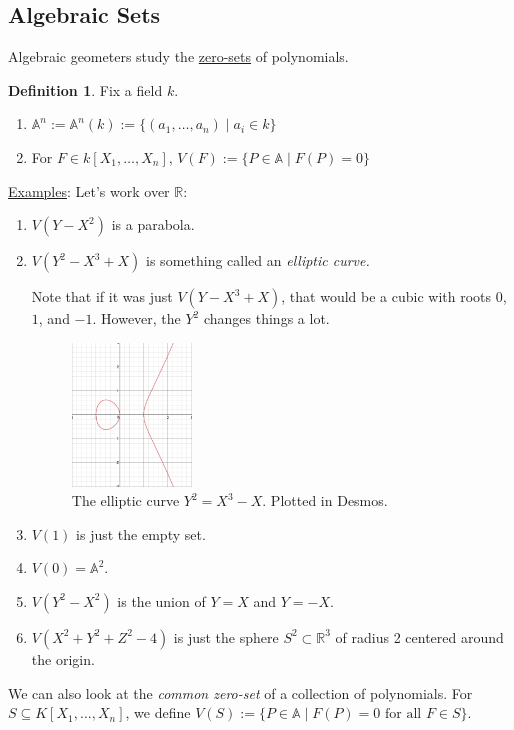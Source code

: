 \documentclass[12pt]{article}
\newcommand{\real}{\mathbb{R}}
\newcommand{\ita}[1]{\textit{#1}}
\theoremstyle{definition}
\newtheorem{definition}[theorem]{Definition}
\begin{document}
\subsection{Algebraic Sets}
Algebraic geometers study the \underline{zero-sets} of polynomials.
\begin{definition}
    Fix a field $k$. 
    \begin{enumerate}
        \item $\mathbb{A}^n:=\mathbb{A}^n(k):=\{(a_1,\dotsc,a_n)\mid a_i\in k\}$
        \item For $F\in k[X_1,\dotsc,X_n]$, $V(F):=\{P\in\mathbb{A}\mid F(P)=0\}$
    \end{enumerate}
\end{definition}
\underline{Examples}: Let's work over $\real$:
\begin{enumerate}
    \item $V(Y-X^2)$ is a parabola.
    \item $V(Y^2-X^3+X)$ is something called an \ita{elliptic curve.}
    
    Note that if it was just $V(Y-X^3+X)$, that would be a cubic with roots $0$, $1$, and $-1$. However, the $Y^2$ changes things a lot. 
    \begin{figure}[H]
        \centering
        \includegraphics[width=0.3\textwidth]{1.png}
        \caption{The elliptic curve $Y^2=X^3-X$. Plotted in Desmos.}
    \end{figure}
    \item $V(1)$ is just the empty set.
    \item $V(0)=\mathbb{A}^2$.
    \item $V(Y^2-X^2)$ is the union of $Y=X$ and $Y=-X$. 
    \item $V(X^2+Y^2+Z^2-4)$ is just the sphere $S^2\subset\real^3$ of radius 2 centered around the origin.
\end{enumerate}
We can also look at the \ita{common zero-set} of a collection of polynomials. For $S\subseteq K[X_1,\dotsc,X_n]$, we define $V(S):=\{P\in\mathbb{A}\mid F(P)=0\text{ for all }F\in S\}$.\\\\
\end{document}
